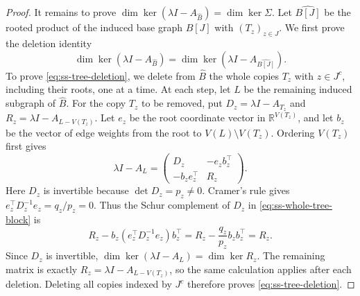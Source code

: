 \documentclass[11pt,a4paper]{article}
\theoremstyle{plain}
\theoremstyle{definition}
\newcommand{\R}{\mathbb{R}}
\begin{document}
\begin{proof}
It remains to prove $\dim\ker(\lambda I-A_{\widehat B})=\dim\ker \Sigma$.
Let $\widehat{B[J]}$ be the rooted product of the induced base graph
$B[J]$ with $(T_z)_{z\in J}$.
We first prove the deletion identity
\begin{equation}\label{eq:ss-tree-deletion}
 \dim\ker(\lambda I-A_{\widehat B})
 =\dim\ker(\lambda I-A_{\widehat{B[J]}}).
\end{equation}
To prove \cref{eq:ss-tree-deletion}, we delete from $\widehat B$
the whole copies $T_z$ with $z\in J^c$, including their roots, one at a time.
At each step, let $L$ be the remaining induced subgraph of $\widehat B$.
For the copy $T_z$ to be removed, put $D_z=\lambda I-A_{T_z}$ and
$R_z=\lambda I-A_{L-V(T_z)}$.
Let $e_z$ be the root coordinate vector in $\R^{V(T_z)}$, and let
$b_z$ be the vector of edge weights from the root to $V(L)\setminus V(T_z)$.
Ordering $V(T_z)$ first gives
\begin{equation}\label{eq:ss-whole-tree-block}
 \lambda I-A_L=
 \begin{pmatrix}D_z&-e_zb_z^{\top}\\-b_ze_z^{\top}&R_z\end{pmatrix}.
\end{equation}
Here $D_z$ is invertible because $\det D_z=p_z\ne0$.
Cramer's rule gives $e_z^{\top}D_z^{-1}e_z=q_z/p_z=0$.
Thus the Schur complement of $D_z$ in \cref{eq:ss-whole-tree-block} is
\begin{equation}\label{eq:ss-zero-tree-correction}
 R_z-b_z(e_z^{\top}D_z^{-1}e_z)b_z^{\top}
 =R_z-\frac{q_z}{p_z}b_zb_z^{\top}=R_z.
\end{equation}
Since $D_z$ is invertible,
$\dim\ker(\lambda I-A_L)=\dim\ker R_z$.
The remaining matrix is exactly $R_z=\lambda I-A_{L-V(T_z)}$,
so the same calculation applies after each deletion.
Deleting all copies indexed by $J^c$ therefore proves
\cref{eq:ss-tree-deletion}.


\end{proof}
\end{document}
